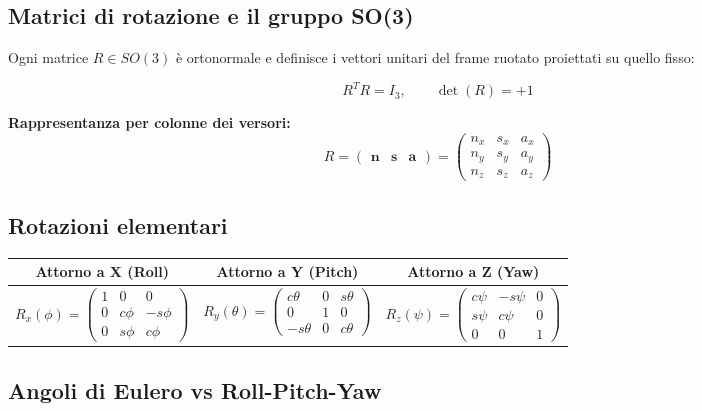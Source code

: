 \documentclass[11pt, a4paper]{article}
\begin{document}
\subsection{Matrici di rotazione e il gruppo SO(3)}

Ogni matrice $R \in SO(3)$ è ortonormale e definisce i vettori unitari del frame ruotato
proiettati su quello fisso:
\begin{formulabox}
\[
R^T R = I_3, \qquad \det(R) = +1
\]

\medskip
\textbf{Rappresentanza per colonne dei versori:}
\[
R = \begin{pmatrix} \mathbf{n} & \mathbf{s} & \mathbf{a} \end{pmatrix}
  = \begin{pmatrix} n_x & s_x & a_x \\ n_y & s_y & a_y \\ n_z & s_z & a_z \end{pmatrix}
\]
\end{formulabox}

\subsection{Rotazioni elementari}

\begin{center}
\renewcommand{\arraystretch}{1.6}
\begin{tabular}{ccc}
\toprule
\textbf{Attorno a X (Roll)} & \textbf{Attorno a Y (Pitch)} & \textbf{Attorno a Z (Yaw)}\\
\midrule
$R_x(\phi) = \begin{pmatrix} 1 & 0 & 0 \\ 0 & c\phi & -s\phi \\ 0 & s\phi & c\phi \end{pmatrix}$
&
$R_y(\theta) = \begin{pmatrix} c\theta & 0 & s\theta \\ 0 & 1 & 0 \\ -s\theta & 0 & c\theta \end{pmatrix}$
&
$R_z(\psi) = \begin{pmatrix} c\psi & -s\psi & 0 \\ s\psi & c\psi & 0 \\ 0 & 0 & 1 \end{pmatrix}$\\
\bottomrule
\end{tabular}
\end{center}

\subsection{Angoli di Eulero vs Roll-Pitch-Yaw}
\end{document}
